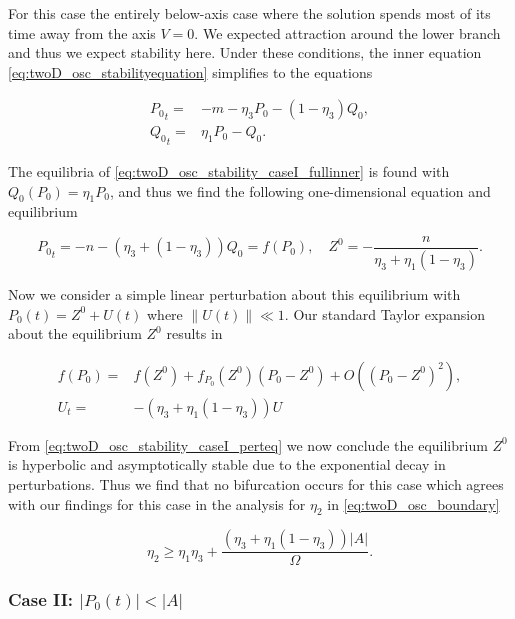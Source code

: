 For this case the entirely below-axis case where the solution spends most of its time away from the axis $V=0$. We expected attraction around the lower branch and thus we expect stability here. Under these conditions, the inner equation \eqref{eq:twoD_osc_stabilityequation} simplifies to the equations

\begin{equation}\label{eq:twoD_osc_stability_caseI_fullinner}
\begin{aligned}
{P_0}_t =& -m -\eta_3 P_0-(1-\eta_3)Q_0,\\
{Q_0}_t =& \eta_1 P_0 - Q_0.
\end{aligned}
\end{equation}

The equilibria of \eqref{eq:twoD_osc_stability_caseI_fullinner} is found with $Q_0(P_0)=\eta_1 P_0$, and thus we find the following one-dimensional equation and equilibrium

\begin{equation}\label{eq:twoD_osc_stability_caseI_red}
{P_0}_t = -n -(\eta_3 +(1-\eta_3))Q_0=f(P_0),\quad Z^0 = -\frac{n}{\eta_3+\eta_1(1-\eta_3)}.
\end{equation}

Now we consider a simple linear perturbation about this equilibrium with $P_0(t)= Z^0+U(t)$ where $\lVert U(t) \rVert \ll 1$. Our standard Taylor expansion about the equilibrium $Z^0$ results in

\begin{equation}\label{eq:twoD_osc_stability_caseI_perteq}
\begin{aligned}
f(P_0)=&f(Z^0)+f_{P_0}(Z^0)(P_0-Z^0)+O((P_0-Z^0)^2),\\
U_t =& -(\eta_3+\eta_1(1-\eta_3))U
\end{aligned}
\end{equation}

From \eqref{eq:twoD_osc_stability_caseI_perteq} we now conclude the equilibrium $Z^0$ is hyperbolic and asymptotically stable due to the exponential decay in perturbations. Thus we find that no bifurcation occurs for this case which agrees with our findings for this case in the analysis for $\eta_2$ in \eqref{eq:twoD_osc_boundary}

\begin{equation*}
\eta_2 \ge \eta_1\eta_3 +\frac{(\eta_3+\eta_1(1-\eta_3))|A|}{\Omega}.
\end{equation*}


\subsubsection{Case II: $|P_0(t)|<|A|$}

